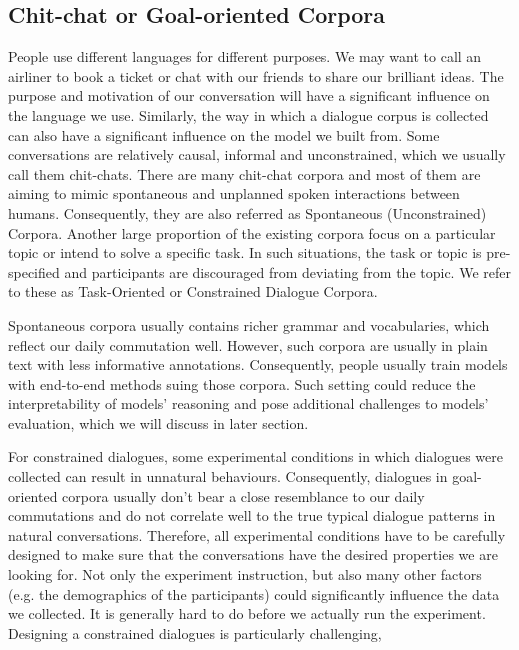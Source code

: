 \documentclass[bsc,frontabs,twoside,singlespacing,parskip,deptreport]{infthesis}     %
\begin{document}
\subsection{Chit-chat or Goal-oriented Corpora}

People use different languages for different purposes. We may want to call an airliner to book a ticket or chat with our friends to share our brilliant ideas. The purpose and motivation of our conversation will have a significant influence on the language we use. Similarly, the way in which a dialogue corpus is collected can also have a significant influence on the model we built from. Some conversations are relatively causal, informal and unconstrained, which we usually call them chit-chats. There are many chit-chat corpora and most of them are aiming to mimic spontaneous and unplanned spoken interactions between humans. Consequently, they are also referred as Spontaneous (Unconstrained) Corpora\cite{serban2018survey}. Another large proportion of the existing corpora focus on a particular topic or intend to solve a specific task. In such situations, the task or topic is pre-specified and participants are discouraged from deviating from the topic. We refer to these as Task-Oriented or Constrained Dialogue Corpora.

Spontaneous corpora usually contains richer grammar and vocabularies, which reflect our daily commutation well. However, such corpora are usually in plain text with less informative annotations. Consequently, people usually train models with end-to-end methods suing those corpora. Such setting could reduce the interpretability of models' reasoning and pose additional challenges to models' evaluation, which we will discuss in later section. 

For constrained dialogues, some experimental conditions in which dialogues were collected can result in unnatural behaviours. Consequently, dialogues in goal-oriented corpora usually don't bear a close resemblance to our daily commutations and do not correlate well to the true typical dialogue patterns in natural conversations. Therefore, all experimental conditions have to be carefully designed to make sure that the conversations have the desired properties we are looking for. Not only the experiment instruction, but also many other factors (e.g. the demographics of the participants\cite{ai2007comparing,young2013pomdp}) could significantly influence the data we collected. It is generally hard to do before we actually run the experiment. Designing a constrained dialogues is particularly challenging, 
\end{document}
